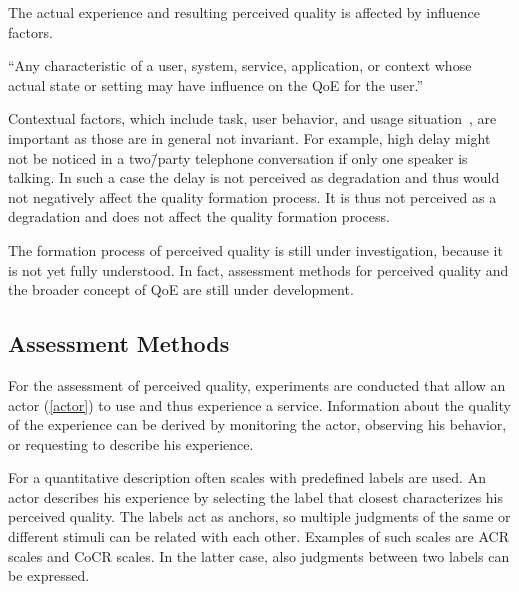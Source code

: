 The actual experience and resulting perceived quality is affected by influence factors.
\begin{definition}
``Any characteristic of a user, system, service, application, or context whose actual state or setting may have influence on the \ac{QoE} for the user.''~\citep[][p.\,56]{reiter_factors_2014}
\end{definition}
Contextual factors, which include task, user behavior, and usage situation~\citep[][p.\,56]{reiter_factors_2014}, are important as those are in general not invariant.
For example, high delay might not be noticed in a two\=/party telephone conversation if only one speaker is talking.
In such a case the delay is not perceived as degradation and thus would not negatively affect the quality formation process.
It is thus not perceived as a degradation and does not affect the quality formation process. %

The formation process of perceived quality is still under investigation, because it is not yet fully understood. %
In fact, assessment methods for perceived quality and the broader concept of \ac{QoE} are still under development.

\subsection{Assessment Methods}
For the assessment of perceived quality, experiments are conducted that allow an actor (\autoref{actor}) to use and thus experience a service.
Information about the quality of the experience can be derived by monitoring the actor, observing his behavior, or requesting to describe his experience.

For a quantitative description often scales with predefined labels are used.
An actor describes his experience by selecting the label that closest characterizes his perceived quality.
The labels act as anchors, so multiple judgments of the same or different stimuli can be related with each other.
Examples of such scales are \acf{ACR} scales and \acf{CoCR} scales.
In the latter case, also judgments between two labels can be expressed.

